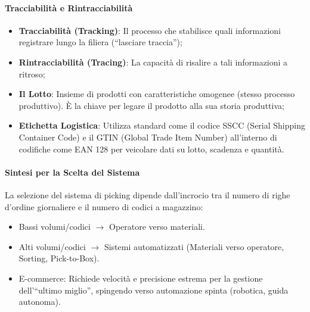 \paragraph{Tracciabilità e Rintracciabilità}
\begin{itemize}
    \item \textbf{Tracciabilità (Tracking)}: Il processo che stabilisce quali informazioni registrare lungo la filiera (``lasciare traccia'');
    \item \textbf{Rintracciabilità (Tracing)}: La capacità di risalire a tali informazioni a ritroso;
    \item \textbf{Il Lotto}: Insieme di prodotti con caratteristiche omogenee (stesso processo produttivo). È la chiave per legare il prodotto alla sua storia produttiva;
    \item \textbf{Etichetta Logistica}: Utilizza standard come il codice SSCC (Serial Shipping Container Code) e il GTIN (Global Trade Item Number) all'interno di codifiche come EAN 128 per veicolare dati su lotto, scadenza e quantità.
\end{itemize}

%
\paragraph{Sintesi per la Scelta del Sistema} La selezione del sistema di picking dipende dall'incrocio tra il numero di righe d'ordine giornaliere e il numero di codici a magazzino:
\begin{itemize}
    \item Bassi volumi/codici $\rightarrow$ Operatore verso materiali.
    \item Alti volumi/codici $\rightarrow$ Sistemi automatizzati (Materiali verso operatore, Sorting, Pick-to-Box).
    \item E-commerce: Richiede velocità e precisione estrema per la gestione dell'``ultimo miglio'', spingendo verso automazione spinta (robotica, guida autonoma).
\end{itemize}